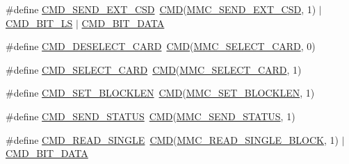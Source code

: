 \begin{DoxyCompactItemize}
\item 
\#define \hyperlink{group___s_d_m_m_c__18_x_x__43_x_x_ga10e85a24b7cba4d141e3675ee4f5ff87}{C\+M\+D\+\_\+\+S\+E\+N\+D\+\_\+\+E\+X\+T\+\_\+\+C\+SD}~\hyperlink{group___s_d_m_m_c__18_x_x__43_x_x_ga7caafa608408eea45aca375d0d5eb211}{C\+MD}(\hyperlink{group___c_h_i_p___s_d_m_m_c___definitions_ga99c5e064412194f85d8009e48332230d}{M\+M\+C\+\_\+\+S\+E\+N\+D\+\_\+\+E\+X\+T\+\_\+\+C\+SD}, 1) $\vert$ \hyperlink{group___s_d_m_m_c__18_x_x__43_x_x_gac7c44bedf5c41fd5ed18712aa2ef69a7}{C\+M\+D\+\_\+\+B\+I\+T\+\_\+\+LS} $\vert$ \hyperlink{group___s_d_m_m_c__18_x_x__43_x_x_gac4b629fb5a202bac675389cf3e28a197}{C\+M\+D\+\_\+\+B\+I\+T\+\_\+\+D\+A\+TA}
\item 
\#define \hyperlink{group___s_d_m_m_c__18_x_x__43_x_x_gad99c2d8aed294cecd866bc2b6960c0c9}{C\+M\+D\+\_\+\+D\+E\+S\+E\+L\+E\+C\+T\+\_\+\+C\+A\+RD}~\hyperlink{group___s_d_m_m_c__18_x_x__43_x_x_ga7caafa608408eea45aca375d0d5eb211}{C\+MD}(\hyperlink{group___c_h_i_p___s_d_m_m_c___definitions_gacba63a975a42dfa2ff02772aa57e6a9b}{M\+M\+C\+\_\+\+S\+E\+L\+E\+C\+T\+\_\+\+C\+A\+RD}, 0)
\item 
\#define \hyperlink{group___s_d_m_m_c__18_x_x__43_x_x_ga82a7e6d4f6cb7c5c6fe6fd35e7bdfd5a}{C\+M\+D\+\_\+\+S\+E\+L\+E\+C\+T\+\_\+\+C\+A\+RD}~\hyperlink{group___s_d_m_m_c__18_x_x__43_x_x_ga7caafa608408eea45aca375d0d5eb211}{C\+MD}(\hyperlink{group___c_h_i_p___s_d_m_m_c___definitions_gacba63a975a42dfa2ff02772aa57e6a9b}{M\+M\+C\+\_\+\+S\+E\+L\+E\+C\+T\+\_\+\+C\+A\+RD}, 1)
\item 
\#define \hyperlink{group___s_d_m_m_c__18_x_x__43_x_x_gacc98caadb00bb27cee9c6037193adb68}{C\+M\+D\+\_\+\+S\+E\+T\+\_\+\+B\+L\+O\+C\+K\+L\+EN}~\hyperlink{group___s_d_m_m_c__18_x_x__43_x_x_ga7caafa608408eea45aca375d0d5eb211}{C\+MD}(\hyperlink{group___c_h_i_p___s_d_m_m_c___definitions_gab1142dc0b5000334f36fff50f7866b72}{M\+M\+C\+\_\+\+S\+E\+T\+\_\+\+B\+L\+O\+C\+K\+L\+EN}, 1)
\item 
\#define \hyperlink{group___s_d_m_m_c__18_x_x__43_x_x_gafc227f5ab9e89ace42c1416fa095f8aa}{C\+M\+D\+\_\+\+S\+E\+N\+D\+\_\+\+S\+T\+A\+T\+US}~\hyperlink{group___s_d_m_m_c__18_x_x__43_x_x_ga7caafa608408eea45aca375d0d5eb211}{C\+MD}(\hyperlink{group___c_h_i_p___s_d_m_m_c___definitions_gaccf43154387f91ebfb4bc63b96fcb1bf}{M\+M\+C\+\_\+\+S\+E\+N\+D\+\_\+\+S\+T\+A\+T\+US}, 1)
\item 
\#define \hyperlink{group___s_d_m_m_c__18_x_x__43_x_x_gaab6c6946e5ead4de14ec4c74e8291bb1}{C\+M\+D\+\_\+\+R\+E\+A\+D\+\_\+\+S\+I\+N\+G\+LE}~\hyperlink{group___s_d_m_m_c__18_x_x__43_x_x_ga7caafa608408eea45aca375d0d5eb211}{C\+MD}(\hyperlink{group___c_h_i_p___s_d_m_m_c___definitions_gaa79d6d187ee2becb90a44ff70914acb8}{M\+M\+C\+\_\+\+R\+E\+A\+D\+\_\+\+S\+I\+N\+G\+L\+E\+\_\+\+B\+L\+O\+CK}, 1) $\vert$ \hyperlink{group___s_d_m_m_c__18_x_x__43_x_x_gac4b629fb5a202bac675389cf3e28a197}{C\+M\+D\+\_\+\+B\+I\+T\+\_\+\+D\+A\+TA}

\end{DoxyCompactItemize}
